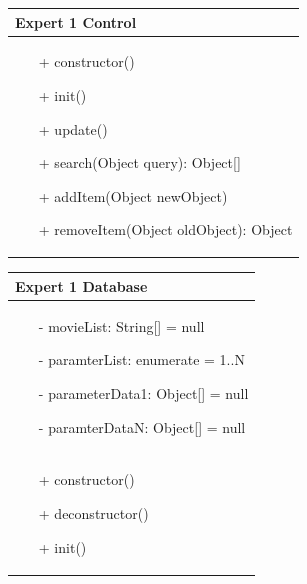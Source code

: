 \documentclass[]{article}
\begin{document}
\begin{table}[H]
\centering
\begin{tabular}{|>{\centering\arraybackslash}p{10cm}|}
\hline
Expert 1 Control\\
\hline
\begin{itemize}
\item[+] constructor()
\item[+] init()
\item[+] update()
\item[+] search(Object query): Object[]
\item[+] addItem(Object newObject)
\item[+] removeItem(Object oldObject): Object
\end{itemize}
\\
\hline
\end{tabular}
\end{table}
%
\begin{table}[H]
\centering
\begin{tabular}{|>{\centering\arraybackslash}p{10cm}|}
\hline
Expert 1 Database\\
\hline
\begin{itemize}
\item[-] movieList: String[] = null
\item[-] paramterList: enumerate = 1..N
\item[-] parameterData1: Object[] = null
\item[-] paramterDataN: Object[] = null
\end{itemize}
\\
\hline
\begin{itemize}
\item[+] constructor()
\item[+] deconstructor()
\item[+] init()
\end{itemize}
\\
\hline
\end{tabular}
\end{table}
%
\end{document}
